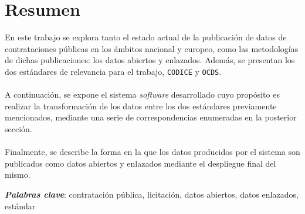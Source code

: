 \vspace*{15em}
\section*{Resumen}
    \vspace{0.5cm}
    \begin{adjustwidth}{45pt}{45pt}
        \hspace{15pt} En este trabajo se explora tanto el estado actual de la publicación de datos de contrataciones públicas en los ámbitos nacional y europeo, como las metodologías de dichas publicaciones: los datos abiertos y enlazados. Además, se presentan los dos estándares de relevancia para el trabajo, \texttt{CODICE} y \texttt{OCDS}.
        \\ \\
        \indent A continuación, se expone el sistema \textit{software} desarrollado cuyo propósito es realizar la transformación de los datos entre los dos estándares previamente mencionados, mediante una serie de correspondencias enumeradas en la posterior sección.
        \\ \\
        \indent Finalmente, se describe la forma en la que los datos producidos por el sistema son publicados como datos abiertos y enlazados mediante el despliegue final del mismo.
    \end{adjustwidth}
    \vspace{1cm}
    \textbf{\textit{Palabras clave}}: contratación pública, licitación, datos abiertos, datos enlazados, estándar

{}

\newpage